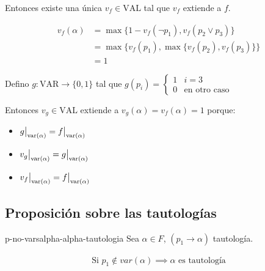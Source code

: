 \begin{itemize}
         Entonces existe una única $v_f \in \mathrm{VAL}$ tal que $v_f$ 
         extiende a $f$.


         \begin{align*}
             v_f(\alpha) &= \max{\{ 1 - v_f(\neg p_1), v_f(p_2 \vee p_3) \}}\\
                         &= \max{\{ v_f(p_1),
                            \max{\{ v_f(p_2), v_f(p_3) \}} \}} \\
                         &= 1
         \end{align*}

         Defino $g: \mathrm{VAR} \to \{ 0, 1 \}$ tal que
         $g(p_i) = \begin{cases}
             1 & i = 3 \\
             0 & \text{en otro caso}
         \end{cases}$

        Entonces $v_g \in \mathrm{VAL}$ extiende a
        $v_g(\alpha) = v_f(\alpha) = 1$
        porque:
        \begin{itemize}
            \item $\frest{g}{\mathrm{var}(\alpha)} =
                \frest{f}{\mathrm{var}(\alpha)}$
        \item $\frest{v_g}{\mathrm{var}(\alpha)} =
            \frest{g}{\mathrm{var}(\alpha)}$
        \item $\frest{v_f}{\mathrm{var}(\alpha)} =
            \frest{f}{\mathrm{var}(\alpha)}$
        \end{itemize}
\end{itemize}


\subsection{Proposición sobre las tautologías}


%
\begin{proposicion}{}{p-no-varsalpha-alpha-tautologia}
    Sea $\alpha \in F$, $(p_1 \to \alpha)$ tautología.

    \medskip

   \begin{gather*}
       \text{Si } p_1 \notin var(\alpha) 
        \implies \alpha \text{ es tautología}
   \end{gather*} 
\end{proposicion}


